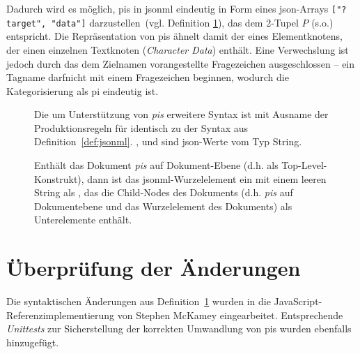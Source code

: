 Dadurch wird es möglich, \glspl{pi} in \acrshort{jsonml} eindeutig in Form eines \acrshort{json}-Arrays \texttt{["?target", "data"]} darzustellen~(vgl. Definition \ref{def:jsonmlpi}), das dem 2-Tupel $P$ (s.o.) entspricht. Die Repräsentation von \glspl{pi} ähnelt damit der eines Elementknotens, der einen einzelnen Textknoten (\emph{Character Data}) enthält. Eine Verwechslung ist jedoch durch das dem Zielnamen vorangestellte Fragezeichen ausgeschlossen -- ein Tagname darfnicht mit einem Fragezeichen beginnen, wodurch die Kategorisierung als \gls{pi} eindeutig ist.  \begin{figure}[h]
    \begin{definition}
        \label{def:jsonmlpi}

        Die um Unterstützung von \emph{\glspl{pi}} erweitere Syntax ist mit Ausname der Produktionsregeln für  identisch zu der Syntax aus Definition~\ref{def:jsonml}.
        ,  und  sind \acrshort{json}-Werte vom Typ String.

        \begin{grammar}
            
        \end{grammar}

        Enthält das Dokument \emph{\glspl{pi}} auf Dokument-Ebene (d.h. als Top-Level-Konstrukt), dann ist das \acrshort{jsonml}-Wurzelelement ein  mit einem leeren String als , das die Child-Nodes des Dokuments (d.h. \emph{\glspl{pi}} auf Dokumentebene und das Wurzelelement des Dokuments) als Unterelemente enthält.
    \end{definition}
\end{figure}

\section{Überprüfung der Änderungen}

Die syntaktischen Änderungen aus Definition~\ref{def:jsonmlpi} wurden in die JavaScript-Referenz\-implementierung von Stephen McKamey eingearbeitet. Entsprechende \emph{Unittests} zur Sicherstellung der korrekten Umwandlung von \glspl{pi} wurden ebenfalls hinzugefügt.

